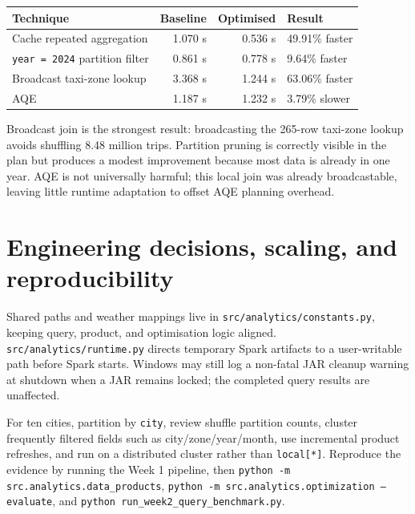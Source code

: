 \documentclass[11pt,a4paper]{article}
\begin{document}
\begin{center}
\small
\begin{tabular}{p{4.2cm}rrl}
\toprule
Technique & Baseline & Optimised & Result \\
\midrule
Cache repeated aggregation & 1.070 s & 0.536 s & 49.91\% faster \\
\texttt{year = 2024} partition filter & 0.861 s & 0.778 s & 9.64\% faster \\
Broadcast taxi-zone lookup & 3.368 s & 1.244 s & 63.06\% faster \\
AQE & 1.187 s & 1.232 s & 3.79\% slower \\
\bottomrule
\end{tabular}
\end{center}

Broadcast join is the strongest result: broadcasting the 265-row taxi-zone lookup avoids shuffling 8.48 million trips. Partition pruning is correctly visible in the plan but produces a modest improvement because most data is already in one year. AQE is not universally harmful; this local join was already broadcastable, leaving little runtime adaptation to offset AQE planning overhead.

\section{Engineering decisions, scaling, and reproducibility}
Shared paths and weather mappings live in \texttt{src/analytics/constants.py}, keeping query, product, and optimisation logic aligned. \texttt{src/analytics/runtime.py} directs temporary Spark artifacts to a user-writable path before Spark starts. Windows may still log a non-fatal JAR cleanup warning at shutdown when a JAR remains locked; the completed query results are unaffected.

For ten cities, partition by \texttt{city}, review shuffle partition counts, cluster frequently filtered fields such as city/zone/year/month, use incremental product refreshes, and run on a distributed cluster rather than \texttt{local[*]}. Reproduce the evidence by running the Week 1 pipeline, then \texttt{python -m src.analytics.data\_products}, \texttt{python -m src.analytics.optimization --evaluate}, and \texttt{python run\_week2\_query\_benchmark.py}.
\end{document}
